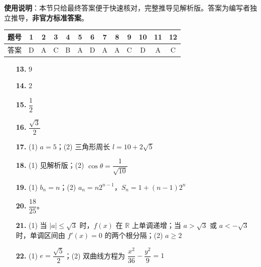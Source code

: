 
\begin{gknotice}
\textbf{使用说明}：本节只给最终答案便于快速核对，完整推导见解析版。答案为编写者独立推导，\textbf{非官方标准答案}。
\end{gknotice}

\begin{center}\begin{tabular}{ccccccccccccc}
\toprule
题号 & 1 & 2 & 3 & 4 & 5 & 6 & 7 & 8 & 9 & 10 & 11 & 12 \\
\midrule
答案 & D & A & C & B & A & D & A & A & C & D & A & C \\
\bottomrule
\end{tabular}\end{center}

\begin{itemize}[leftmargin=2.6em]
  \item[\textbf{13.}] $9$
  \item[\textbf{14.}] $2$
  \item[\textbf{15.}] $\dfrac12$
  \item[\textbf{16.}] $\dfrac{\sqrt3}{2}$
\end{itemize}

\begin{itemize}[leftmargin=2.6em]
  \item[\textbf{17.}] (1) $a=5$；(2) 三角形周长 $l=10+2\sqrt5$
  \item[\textbf{18.}] (1) 见解析版；(2) $\cos\theta=\dfrac1{\sqrt{10}}$
  \item[\textbf{19.}] (1) $b_n=n$；(2) $a_n=n2^{n-1}$，$S_n=1+(n-1)2^n$
  \item[\textbf{20.}] $\dfrac{18}{25}$。
  \item[\textbf{21.}] (1) 当 $|a|\leqslant\sqrt3$ 时，$f(x)$ 在 $\mathbb R$ 上单调递增；当 $a>\sqrt3$ 或 $a<-\sqrt3$ 时，单调区间由 $f'(x)=0$ 的两个根分隔；(2) $a\geqslant2$
  \item[\textbf{22.}] (1) $e=\dfrac{\sqrt5}{2}$；(2) 双曲线方程为 $\dfrac{x^2}{36}-\dfrac{y^2}{9}=1$
\end{itemize}
